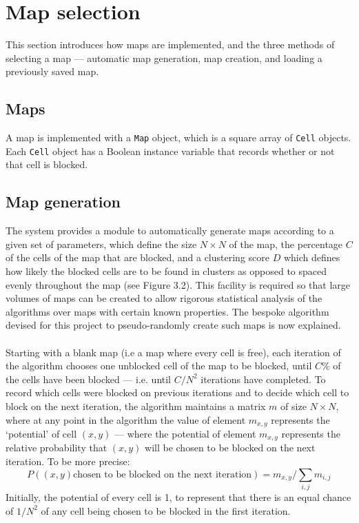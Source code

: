 \documentclass[12pt,notitlepage]{report}
\begin{document}
\section{Map selection}

This section introduces how maps are implemented, and the three methods of selecting a map --- automatic map generation, map creation, and loading a previously saved map.\\

\subsection{Maps}
A map is implemented with a {\tt Map} object, which is a square array of {\tt Cell} objects. Each {\tt Cell} object has a Boolean instance variable that records whether or not that cell is blocked.

\subsection{Map generation}
The system provides a module to automatically generate maps according to a given set of parameters, which define the size $N \times N$ of the map, the percentage $C$ of the cells of the map that are blocked, and a clustering score $D$ which defines how likely the blocked cells are to be found in clusters as opposed to spaced evenly throughout the map (see Figure 3.2). This facility is required so that large volumes of maps can be created to allow rigorous statistical analysis of the algorithms over maps with certain known properties. The bespoke algorithm devised for this project to pseudo-randomly create such maps is now explained.\\

\\
\noindent
Starting with a blank map (i.e a map where every cell is free), each iteration of the algorithm chooses one unblocked cell of the map to be blocked, until $C\%$ of the cells have been blocked --- i.e. until $C/N^{2}$ iterations have completed. To record which cells were blocked on previous iterations and to decide which cell to block on the next iteration, the algorithm maintains a matrix $m$ of size $N \times N$, where at any point in the algorithm the value of element $m_{x,y}$ represents the `potential' of cell $(x,y)$ --- where the potential of element $m_{x,y}$ represents the relative probability that $(x,y)$ will be chosen to be blocked on the next iteration. To be more precise: 
\begin{equation}
P((x,y) \mbox{chosen to be blocked on the next iteration}) = m_{x,y}/\sum\limits_{i,j} m_{i,j}
\end{equation}
\noindent
Initially, the potential of every cell is 1, to represent that there is an equal chance of $1/N^{2}$ of any cell being chosen to be blocked in the first iteration.\\
\end{document}
